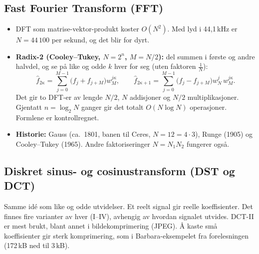 \subsection{Fast Fourier Transform (FFT)}
\begin{itemize}
  \item DFT som matrise-vektor-produkt koster $O(N^2)$. Med lyd i 44,1\,kHz er $N=44\,100$ per sekund, og det blir for dyrt.
  \item \textbf{Radix-2 (Cooley--Tukey, $N=2^n$, $M=N/2$):} del summen i første og andre halvdel, og se på like og odde $k$ hver for seg (uten faktoren $\frac1N$):
  \[
  \hat f_{2\kappa}=\sum_{j=0}^{M-1}\bigl(f_j+f_{j+M}\bigr)w_M^{j\kappa},\qquad
  \hat f_{2\kappa+1}=\sum_{j=0}^{M-1}\bigl(f_j-f_{j+M}\bigr)w_N^{j}\,w_M^{j\kappa}.
  \]
  Det gir to DFT-er av lengde $N/2$, $N$ addisjoner og $N/2$ multiplikasjoner. Gjentatt $n=\log_2N$ ganger gir det totalt $O(N\log N)$ operasjoner. Formlene er kontrollregnet.
  \item \textbf{Historie:} Gauss (ca.\ 1801, banen til Ceres, $N=12=4\cdot3$), Runge (1905) og Cooley--Tukey (1965). Andre faktoriseringer $N=N_1N_2$ fungerer også.
\end{itemize}

\subsection{Diskret sinus- og cosinustransform (DST og DCT)}
Samme idé som like og odde utvidelser. Et reelt signal gir reelle koeffisienter. Det finnes fire varianter av hver (I--IV), avhengig av hvordan signalet utvides. DCT-II er mest brukt, blant annet i bildekomprimering (JPEG). Å kaste små koeffisienter gir sterk komprimering, som i Barbara-eksempelet fra forelesningen (172\,kB ned til 3\,kB).


